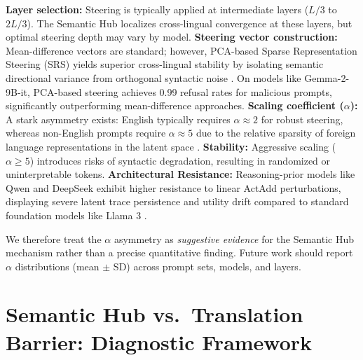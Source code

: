\documentclass[11pt]{article}
\begin{document}
\noindent \textbf{Layer selection:} Steering is typically applied at intermediate layers ($L/3$ to $2L/3$). The Semantic Hub localizes cross-lingual convergence at these layers, but optimal steering depth may vary by model. \textbf{Steering vector construction:} Mean-difference vectors are standard; however, PCA-based Sparse Representation Steering (SRS) yields superior cross-lingual stability by isolating semantic directional variance from orthogonal syntactic noise \citep{lee2025sparse}. On models like Gemma-2-9B-it, PCA-based steering achieves 0.99 refusal rates for malicious prompts, significantly outperforming mean-difference approaches. \textbf{Scaling coefficient ($\alpha$):} A stark asymmetry exists: English typically requires $\alpha \approx 2$ for robust steering, whereas non-English prompts require $\alpha \approx 5$ due to the relative sparsity of foreign language representations in the latent space \citep{wu2024semantichub, turner2023actadd}. \textbf{Stability:} Aggressive scaling ($\alpha \geq 5$) introduces risks of syntactic degradation, resulting in randomized or uninterpretable tokens. \textbf{Architectural Resistance:} Reasoning-prior models like Qwen and DeepSeek exhibit higher resistance to linear ActAdd perturbations, displaying severe latent trace persistence and utility drift compared to standard foundation models like Llama 3 \citep{turner2023actadd}.

\noindent We therefore treat the $\alpha$ asymmetry as \textit{suggestive evidence} for the Semantic Hub mechanism rather than a precise quantitative finding. Future work should report $\alpha$ distributions (mean $\pm$ SD) across prompt sets, models, and layers.

\section{Semantic Hub vs.\ Translation Barrier: Diagnostic Framework}
\label{app:diagnostic}

\begin{table}[h]
\centering
\small
{}
\caption{Diagnostic framework for distinguishing Semantic Hub from Translation Barrier failures.}
\label{tab:diagnostic}
\end{table}
\end{document}
